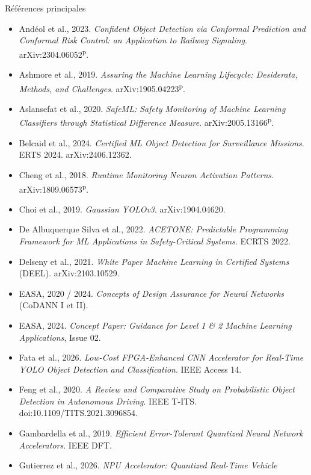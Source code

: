 \documentclass[aspectratio=169,11pt]{beamer}
\newcommand{\pre}{\textsuperscript{\color{acc}p}}
\begin{document}
\begin{frame}[allowframebreaks]{Références principales}
  \scriptsize
  \begin{itemize}
    \item Andéol et al., 2023. \textit{Confident Object Detection via Conformal Prediction
          and Conformal Risk Control: an Application to Railway Signaling}. arXiv:2304.06052\pre.
    \item Ashmore et al., 2019. \textit{Assuring the Machine Learning Lifecycle: Desiderata,
          Methods, and Challenges}. arXiv:1905.04223\pre.
    \item Aslansefat et al., 2020. \textit{SafeML: Safety Monitoring of Machine Learning
          Classifiers through Statistical Difference Measure}. arXiv:2005.13166\pre.
    \item Belcaid et al., 2024. \textit{Certified ML Object Detection for Surveillance
          Missions}. ERTS 2024. arXiv:2406.12362.
    \item Cheng et al., 2018. \textit{Runtime Monitoring Neuron Activation Patterns}.
          arXiv:1809.06573\pre.
    \item Choi et al., 2019. \textit{Gaussian YOLOv3}. arXiv:1904.04620.
    \item De Albuquerque Silva et al., 2022. \textit{ACETONE: Predictable Programming
          Framework for ML Applications in Safety-Critical Systems}. ECRTS 2022.
    \item Delseny et al., 2021. \textit{White Paper Machine Learning in Certified Systems}
          (DEEL). arXiv:2103.10529.
    \item EASA, 2020 / 2024. \textit{Concepts of Design Assurance for Neural Networks}
          (CoDANN I et II).
    \item EASA, 2024. \textit{Concept Paper: Guidance for Level 1 \& 2 Machine Learning
          Applications}, Issue 02.
    \item Fata et al., 2026. \textit{Low-Cost FPGA-Enhanced CNN Accelerator for Real-Time
          YOLO Object Detection and Classification}. IEEE Access 14.
    \item Feng et al., 2020. \textit{A Review and Comparative Study on Probabilistic Object
          Detection in Autonomous Driving}. IEEE T-ITS. doi:10.1109/TITS.2021.3096854.
    \item Gambardella et al., 2019. \textit{Efficient Error-Tolerant Quantized Neural Network
          Accelerators}. IEEE DFT.
    \item Gutierrez et al., 2026. \textit{NPU Accelerator: Quantized Real-Time Vehicle
}
\end{itemize}
\end{frame}
\end{document}

